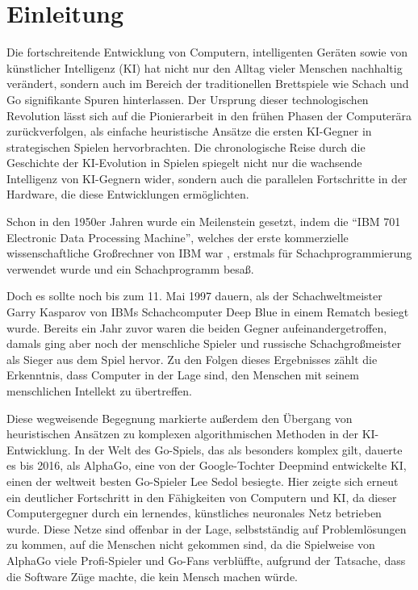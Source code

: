 \chapter{Einleitung}
\label{chapter:einleitung}

Die fortschreitende Entwicklung von Computern, intelligenten Geräten sowie von künstlicher Intelligenz (\acs{KI}) hat nicht nur den Alltag vieler Menschen nachhaltig verändert, sondern auch im Bereich der traditionellen Brettspiele wie Schach und Go signifikante Spuren hinterlassen. Der Ursprung dieser technologischen Revolution lässt sich auf die Pionierarbeit in den frühen Phasen der Computerära zurückverfolgen, als einfache heuristische Ansätze die ersten \acs{KI}-Gegner in strategischen Spielen hervorbrachten. Die chronologische Reise durch die Geschichte der \acs{KI}-Evolution in Spielen spiegelt nicht nur die wachsende Intelligenz von \acs{KI}-Gegnern wider, sondern auch die parallelen Fortschritte in der Hardware, die diese Entwicklungen ermöglichten.

Schon in den 1950er Jahren wurde ein Meilenstein gesetzt, indem die \enquote{\acs{IBM} 701 Electronic Data Processing Machine}, welches der erste kommerzielle wissenschaftliche Großrechner von \ac{IBM} war \cite{2023.IBM701}, erstmals für Schachprogrammierung verwendet wurde und ein Schachprogramm besaß. \cite{2014.EndeDerBescheidenheit}

Doch es sollte noch bis zum 11. Mai 1997 dauern, als der Schachweltmeister Garry Kasparov von \ac{IBM}s Schachcomputer Deep Blue in einem Rematch besiegt wurde. Bereits ein Jahr zuvor waren die beiden Gegner aufeinandergetroffen, damals ging aber noch der menschliche Spieler und russische Schachgroßmeister als Sieger aus dem Spiel hervor. Zu den Folgen dieses Ergebnisses zählt die Erkenntnis, dass Computer in der Lage sind, den Menschen mit seinem menschlichen Intellekt zu übertreffen. \cite{2022.DeepBlue}

Diese wegweisende Begegnung markierte außerdem den Übergang von heuristischen Ansätzen zu komplexen algorithmischen Methoden in der \acs{KI}-Entwicklung. In der Welt des Go-Spiels, das als besonders komplex gilt, dauerte es bis 2016, als AlphaGo, eine von der Google-Tochter Deepmind entwickelte \ac{KI}, einen der weltweit besten Go-Spieler Lee Sedol besiegte. Hier zeigte sich erneut ein deutlicher Fortschritt in den Fähigkeiten von Computern und \ac{KI}, da dieser Computergegner durch ein lernendes, künstliches neuronales Netz betrieben wurde. Diese Netze sind offenbar in der Lage, selbstständig auf Problemlösungen zu kommen, auf die Menschen nicht gekommen sind, da die Spielweise von AlphaGo viele Profi-Spieler und Go-Fans verblüffte, aufgrund der Tatsache, dass die Software Züge machte, die kein Mensch machen würde. \cite{2016.AlphaGo}

